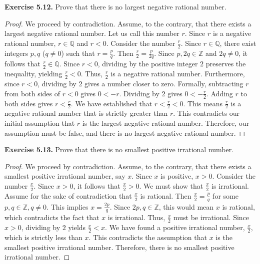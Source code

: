 \documentclass[11pt, letterpaper]{article}
\theoremstyle{remark}
\newcommand{\Z}{\mathbb{Z}}
\newcommand{\Q}{\mathbb{Q}}
\begin{document}
\textbf{Exercise 5.12.} Prove that there is no largest negative rational number.
\begin{proof}
We proceed by contradiction. Assume, to the contrary, that there exists a largest negative rational number. Let us call this number $r$.
Since $r$ is a negative rational number, $r \in \Q$ and $r < 0$.
Consider the number $\frac{r}{2}$. 
Since $r \in \Q$, there exist integers $p, q$ ($q \neq 0$) such that $r = \frac{p}{q}$. Then $\frac{r}{2} = \frac{p}{2q}$. Since $p, 2q \in \Z$ and $2q \neq 0$, it follows that $\frac{r}{2} \in \Q$.
Since $r < 0$, dividing by the positive integer $2$ preserves the inequality, yielding $\frac{r}{2} < 0$. Thus, $\frac{r}{2}$ is a negative rational number.
Furthermore, since $r < 0$, dividing by $2$ gives a number closer to zero. Formally, subtracting $r$ from both sides of $r < 0$ gives $0 < -r$. Dividing by $2$ gives $0 < -\frac{r}{2}$. Adding $r$ to both sides gives $r < \frac{r}{2}$.
We have established that $r < \frac{r}{2} < 0$.
This means $\frac{r}{2}$ is a negative rational number that is strictly greater than $r$. This contradicts our initial assumption that $r$ is the largest negative rational number.
Therefore, our assumption must be false, and there is no largest negative rational number.
\end{proof}

\textbf{Exercise 5.13.} Prove that there is no smallest positive irrational number.
\begin{proof}
We proceed by contradiction. Assume, to the contrary, that there exists a smallest positive irrational number, say $x$.
Since $x$ is positive, $x > 0$.
Consider the number $\frac{x}{2}$. Since $x > 0$, it follows that $\frac{x}{2} > 0$.
We must show that $\frac{x}{2}$ is irrational. Assume for the sake of contradiction that $\frac{x}{2}$ is rational. Then $\frac{x}{2} = \frac{p}{q}$ for some $p, q \in \Z, q \neq 0$. This implies $x = \frac{2p}{q}$. Since $2p, q \in \Z$, this would mean $x$ is rational, which contradicts the fact that $x$ is irrational. Thus, $\frac{x}{2}$ must be irrational.
Since $x > 0$, dividing by $2$ yields $\frac{x}{2} < x$.
We have found a positive irrational number, $\frac{x}{2}$, which is strictly less than $x$. This contradicts the assumption that $x$ is the smallest positive irrational number.
Therefore, there is no smallest positive irrational number.
\end{proof}
\end{document}
